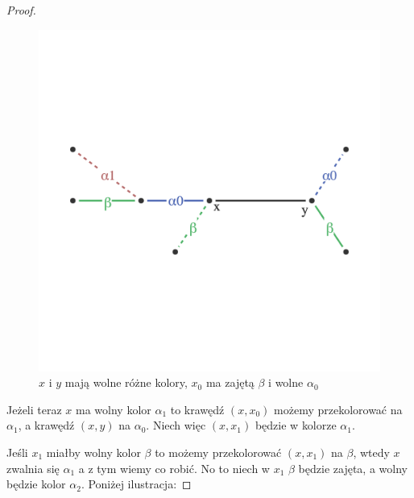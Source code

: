 \begin{proof}
	\begin{figure}[ht]
		\centering
		\includegraphics[scale=0.6]{images/vizing/step_one.png}
		\caption{$x$ i $y$ mają wolne różne kolory, $x_0$ ma zajętą $\beta$ i wolne $\alpha_0$}
	\end{figure}

	Jeżeli teraz $x$ ma wolny kolor $\alpha_1$ to krawędź $(x, x_0)$
	możemy przekolorować na $\alpha_1$, a krawędź $(x, y)$ na $\alpha_0$. Niech więc $(x, x_1)$ będzie w kolorze $\alpha_1$.

	Jeśli $x_1$ miałby wolny kolor $\beta$ to możemy przekolorować $(x, x_1)$ na $\beta$, wtedy $x$ zwalnia się $\alpha_1$ a z tym wiemy co robić.
	No to niech w $x_1$ $\beta$ będzie zajęta, a wolny będzie kolor $\alpha_2$. Poniżej ilustracja:


\end{proof}
